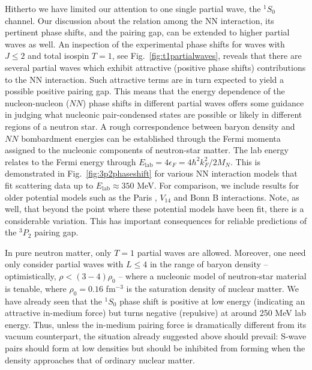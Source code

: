 \documentclass[rmp,aps,floatfix]{revtex4}
\begin{document}
Hitherto we have limited our attention to one single partial wave,
the $^1S_0$ channel. 
Our discussion about the relation among the NN interaction, its
pertinent phase shifts, and
the pairing gap, can be extended to higher partial waves as well. 
An inspection
of the experimental phase shifts for waves with $J \leq 2$ and total 
isospin $T=1$, see
Fig.~\ref{fig:t1partialwaves},
reveals that there are several partial waves which exhibit
attractive (positive phase shifts) contributions
to the NN interaction. Such attractive terms are in turn expected to
yield a possible positive pairing gap. This means that
the energy dependence of the nucleon-nucleon ($NN$) phase shifts in different 
partial waves offers some guidance in judging what nucleonic pair-condensed 
states are possible or likely in different regions of a neutron star.
A rough correspondence between baryon density and $NN$ bombardment energies
can be established through the Fermi momenta assigned to the nucleonic
components of neutron-star matter.
The lab energy relates to the Fermi energy through 
$E_{\mathrm{lab}}=4\epsilon_F=4\hbar^2k_F^2/2M_N$. 
This is demonstrated in Fig.~\ref{fig:3p2phaseshift} for various NN interaction
models that fit scattering data up to $E_{\mathrm{lab}}\approx 350$ MeV.
For comparison, we include results for older 
potential models such as the Paris 
\cite{paris}, $V_{14}$ \cite{v14} and Bonn B \cite{mach89} 
interactions. Note, as well, that 
beyond the point where these potential models 
have been fit, there is a considerable variation. This has important 
consequences for reliable predictions of the $^3P_2$ pairing gap.

In pure neutron matter, only $T=1$ partial waves are allowed.  
Moreover, one need only consider partial 
waves with $L\leq 4$ in the range of baryon density -- optimistically,
$\rho < (3-4) \rho_0$ -- where a nucleonic model of neutron-star material 
is tenable, where $\rho_0=0.16$ fm$^{-3}$ is
the saturation density of nuclear matter.  
We have already seen that the $^1S_0$ phase shift is positive at low energy 
(indicating an attractive in-medium force) but turns negative (repulsive) 
at around 250 MeV lab energy.  Thus, unless the in-medium pairing force 
is dramatically different from its vacuum counterpart, the situation 
already suggested above should prevail:  S-wave pairs should form at 
low densities but should be inhibited from forming when the density 
approaches that of ordinary nuclear matter.  
\end{document}

